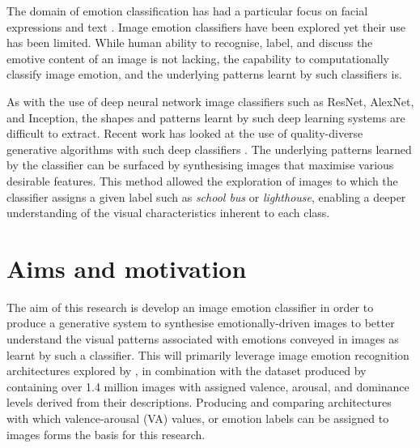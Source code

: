 \documentclass{article}
\begin{document}
The domain of emotion classification has had a particular focus on facial expressions and text \citep{cambria2016affective, warriner2013norms}.
Image emotion classifiers have been explored \citep{kim2018building, machajdik2010affective, chen2015learning, chen2014deepsentibank} yet their use has been limited.
While human ability to recognise, label, and discuss the emotive content of an image is not lacking, the capability to computationally classify image emotion, and the underlying patterns learnt by such classifiers is.

As with the use of deep neural network image classifiers such as ResNet, AlexNet, and Inception, the shapes and patterns learnt by such deep learning systems are difficult to extract.
Recent work has looked at the use of quality-diverse generative algorithms with such deep classifiers \citep{nguyen2015deep, nguyen2015innovation}.
The underlying patterns learned by the classifier can be surfaced by synthesising images that maximise various desirable features.
This method allowed the exploration of images to which the classifier assigns a given label such as \textit{school bus} or \textit{lighthouse}, enabling a deeper understanding of the visual characteristics inherent to each class.

\section{Aims and motivation}
The aim of this research is develop an image emotion classifier in order to produce a generative system to synthesise emotionally-driven images to better understand the visual patterns associated with emotions conveyed in images as learnt by such a classifier.
This will primarily leverage image emotion recognition architectures explored by \citet{kim2018building}, in combination with the dataset produced by \citet{zhao2016predicting} containing over 1.4 million images with assigned valence, arousal, and dominance levels derived from their descriptions.
Producing and comparing architectures with which valence-arousal (VA) values, or emotion labels can be assigned to images forms the basis for this research.
\end{document}
